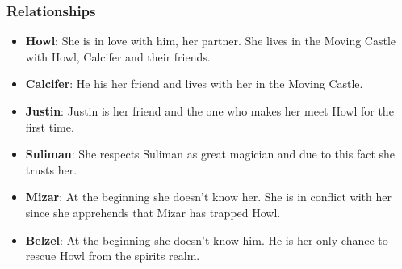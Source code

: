 




\subsubsection*{Relationships}
\begin{itemize}
\item \textbf{Howl}: She is in love with him, her partner. She lives in the Moving Castle with Howl, Calcifer and their friends.
\item \textbf{Calcifer}: He his her friend and lives with her in the Moving Castle.
\item \textbf{Justin}: Justin is her friend and the one who makes her meet Howl for the first time.
\item \textbf{Suliman}: She respects Suliman as great magician and due to this fact she trusts her.
\item \textbf{Mizar}: At the beginning she doesn’t know her. She is in conflict with her since she apprehends that Mizar has trapped Howl.
\item \textbf{Belzel}: At the beginning she doesn’t know him. He is her only chance to rescue Howl from the spirits realm.
\end{itemize}

